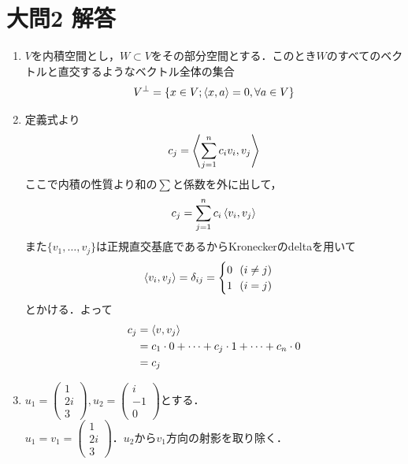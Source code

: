\documentclass[dvipdfmx]{jsreport}
\begin{document}
\section{大問2 解答}
\begin{souanswer} %
\begin{enumerate}
	\item $V$を内積空間とし，$W\subset V$をその部分空間とする．このとき$W$のすべてのベクトルと直交するようなベクトル全体の集合
\begin{equation*}
	V^\perp= \{x\in V; \left\langle{x}, {a}\right\rangle= 0, \forall a\in V\}
\end{equation*}
	\item 定義式より
\begin{equation*}
	c_j= \left\langle{\sum_{j= 1}^n c_iv_i}, {v_j}\right\rangle
\end{equation*}
	ここで内積の性質より和の$\sum$と係数を外に出して，
\begin{equation*}
	c_j= \sum_{j= 1}^n c_i\left\langle{v_i}, {v_j}\right\rangle
\end{equation*}
	また$\{v_1, \ldots, v_j\}$は正規直交基底であるからKroneckerのdeltaを用いて
\begin{equation*}
	\left\langle{v_i}, {v_j}\right\rangle= \delta_{ij}= 
	\begin{cases}
		0\ \ (i\ne j)\\
		1\ \ (i= j)
	\end{cases}
\end{equation*}
	とかける．よって
\begin{align*}
	c_j
	&= \left\langle{v}, {v_j}\right\rangle\\
	&= c_1\cdot 0+ \cdots+ c_j\cdot 1+ \cdots+ c_n\cdot 0\\
	&= c_j	
\end{align*}
	\item $u_1= \begin{pmatrix}1\\ 2i\\ 3\end{pmatrix}, u_2= \begin{pmatrix}i\\ -1\\ 0\end{pmatrix}$とする．\\
	$u_1= v_1= \begin{pmatrix}1\\ 2i\\ 3\end{pmatrix}$．$u_2$から$v_1$方向の射影を取り除く．
\begin{equation*}

\end{equation*}
\end{enumerate}
\end{souanswer}
\end{document}

